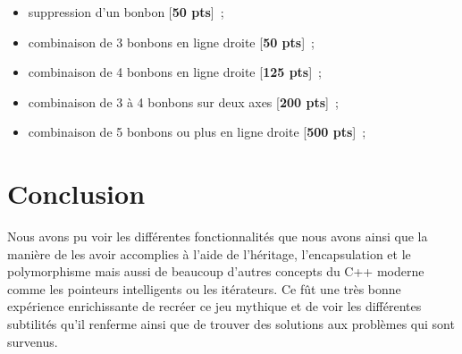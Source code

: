 \documentclass[11pt,a4paper]{article}
\begin{document}
\begin{itemize}
    \item suppression d'un bonbon [\textbf{50 pts}]~;
    \item combinaison de 3 bonbons en ligne droite [\textbf{50 pts}]~;
    \item combinaison de 4 bonbons en ligne droite [\textbf{125 pts}]~;
    \item combinaison de 3 à 4 bonbons sur deux axes [\textbf{200 pts}]~;
    \item combinaison de 5 bonbons ou plus en ligne droite [\textbf{500 pts}]~;
\end{itemize}

\section{Conclusion}

Nous avons pu voir les différentes fonctionnalités que nous
avons ainsi que la manière de les avoir accomplies à
l'aide de l'héritage, l'encapsulation et le polymorphisme mais
aussi de beaucoup d'autres concepts du C++ moderne comme les
pointeurs intelligents ou les itérateurs. Ce fût une très
bonne expérience enrichissante de recréer ce jeu mythique et de voir les
différentes subtilités qu'il renferme ainsi que de trouver
des solutions aux problèmes qui sont survenus.
\end{document}
